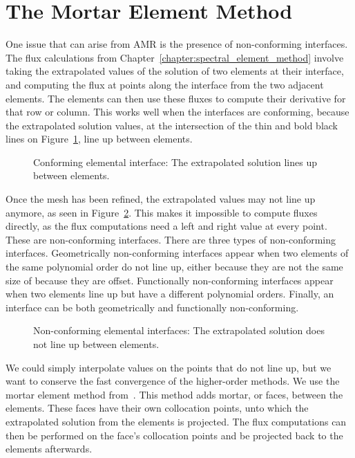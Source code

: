 \section{The Mortar Element Method} \label{section:adaptive_mesh_refinement:mortar_element_method}

One issue that can arise from AMR is the presence of non-conforming interfaces. The flux
calculations from Chapter~\ref{chapter:spectral_element_method} involve taking the extrapolated
values of the solution of two elements at their interface, and computing the flux at points along
the interface from the two adjacent elements. The elements can then use these fluxes to compute their derivative for that row or
column. This works well when the interfaces are conforming, because the extrapolated solution
values, at the intersection of the thin and bold black lines on
Figure~\ref{fig:conforming_interfaces}, line up between elements.

\begin{figure}[H]
	\centering
	
	\caption{Conforming elemental interface: The extrapolated solution lines up between elements.}
	\label{fig:conforming_interfaces}
\end{figure}

Once the mesh has been refined, the extrapolated values may not line up anymore, as seen in
Figure~\ref{fig:non_conforming_interfaces}. This makes it impossible to compute fluxes directly, as
the flux computations need a left and right value at every point. These are non-conforming
interfaces. There are three types of non-conforming interfaces. Geometrically non-conforming
interfaces appear when two elements of the same polynomial order do not line up, either because they
are not the same size of because they are offset. Functionally non-conforming interfaces appear when
two elements line up but have a different polynomial orders. Finally, an interface can be both
geometrically and functionally non-conforming.

\begin{figure}[H]
	\centering
	
	\caption{Non-conforming elemental interfaces: The extrapolated solution does not line up between elements.}
	\label{fig:non_conforming_interfaces}
\end{figure}

We could simply interpolate values on the points that do not line up, but we want to conserve the
fast convergence of the higher-order methods. We use the mortar element method
from~\cite{Maday1989}. This method adds mortar, or faces, between the elements. These faces have
their own collocation points, unto which the extrapolated solution from the elements is projected.
The flux computations can then be performed on the face's collocation points and be projected back
to the elements afterwards.

